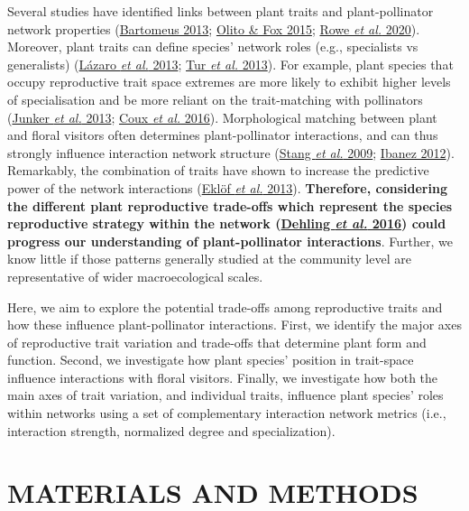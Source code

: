 \documentclass[
  12pt,
  a4paper,
]{article}
\begin{document}
Several studies have identified links between plant traits and plant-pollinator network properties (\protect\hyperlink{ref-bartomeus2013}{Bartomeus 2013}; \protect\hyperlink{ref-olito2015}{Olito \& Fox 2015}; \protect\hyperlink{ref-rowe2020}{Rowe \emph{et al.} 2020}). Moreover, plant traits can define species' network roles (e.g., specialists vs generalists) (\protect\hyperlink{ref-lazaro2013}{Lázaro \emph{et al.} 2013}; \protect\hyperlink{ref-tur2013}{Tur \emph{et al.} 2013}). For example, plant species that occupy reproductive trait space extremes are more likely to exhibit higher levels of specialisation and be more reliant on the trait-matching with pollinators (\protect\hyperlink{ref-junker2013}{Junker \emph{et al.} 2013}; \protect\hyperlink{ref-coux2016}{Coux \emph{et al.} 2016}). Morphological matching between plant and floral visitors often determines plant-pollinator interactions, and can thus strongly influence interaction network structure (\protect\hyperlink{ref-stang2009}{Stang \emph{et al.} 2009}; \protect\hyperlink{ref-ibanez2012}{Ibanez 2012}). Remarkably, the combination of traits have shown to increase the predictive power of the network interactions (\protect\hyperlink{ref-eklof2013}{Eklöf \emph{et al.} 2013}). \textbf{Therefore, considering the different plant reproductive trade-offs which represent the species reproductive strategy within the network (\protect\hyperlink{ref-dehling2016}{Dehling \emph{et al.} 2016}) could progress our understanding of plant-pollinator interactions}. Further, we know little if those patterns generally studied at the community level are representative of wider macroecological scales.

Here, we aim to explore the potential trade-offs among reproductive traits and how these influence plant-pollinator interactions. First, we identify the major axes of reproductive trait variation and trade-offs that determine plant form and function. Second, we investigate how plant species' position in trait-space influence interactions with floral visitors. Finally, we investigate how both the main axes of trait variation, and individual traits, influence plant species' roles within networks using a set of complementary interaction network metrics (i.e., interaction strength, normalized degree and specialization).

\hypertarget{materials-and-methods}{%
\section{MATERIALS AND METHODS}\label{materials-and-methods}}
\end{document}
